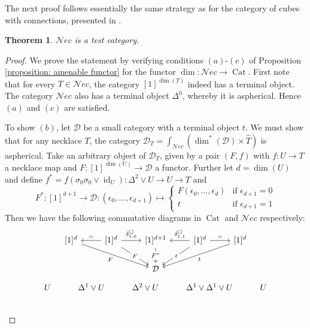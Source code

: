 \documentclass[12pt,a4paper,reqno]{amsart}
\DeclareMathOperator{\id}{id}
\DeclareMathOperator{\Cat}{Cat}
\newcommand{\nec}{\mathcal{N}ec} %
\newtheorem{Thm}{Theorem}[section]
\theoremstyle{definition}
\theoremstyle{remark}
\begin{document}
The next proof follows essentially the same strategy as for the category of cubes with connections, presented in \cite[Lemmas 3.10 and 3.11]{jardine2006categorical}.

\begin{Thm}\label{theorem: nec is test category}
$\nec$ is a test category.
\end{Thm}
\begin{proof}
We prove the statement by verifying conditions $(a)$-$(c)$ of Proposition \ref{proposition: amenable functor} for the functor $\dim: \nec\to \Cat$. First note that for every $T\in \nec$, the category $[1]^{\dim(T)}$ indeed has a terminal object. The category $\nec$ also has a terminal object $\Delta^{0}$, whereby it is aspherical. Hence $(a)$ and $(c)$ are satisfied.

To show $(b)$, let $\mathcal{D}$ be a small category with a terminal object $t$. We must show that for any necklace $T$, the category $\mathcal{D}_{T} = \int_{\nec}(\dim^{*}(\mathcal{D})\times \hat{T})$ is aspherical. Take an arbitrary object of $\mathcal{D}_{T}$, given by a pair $(F,f)$ with $f: U\to T$ a necklace map and $F: [1]^{\dim(U)}\rightarrow \mathcal{D}$ a functor. Further let $d = \dim(U)$ and define $f^{*} = f(\sigma_{0}\sigma_{0}\vee \id_{U}): \Delta^{2}\vee U\to U\to T$ and
$$
F^{*}: [1]^{d+1}\to \mathcal{D}: (\epsilon_{0},\dots,\epsilon_{d+1})\mapsto 
\begin{cases}
F(\epsilon_{0},\dots,\epsilon_{d}) & \text{if }\epsilon_{d+1} = 0\\
t & \text{if }\epsilon_{d+1} = 1
\end{cases}
$$
Then we have the following commutative diagrams in $\Cat$ and $\nec$ respectively:
\[\begin{tikzcd}
	{[1]^{d}} & {[1]^{d}} & {[1]^{d+1}} & {[1]^{d}} & {[1]^{d}} \\
	& & {\mathcal{D}}
	\arrow["{=}"', from=1-2, to=1-1]
	\arrow["{F}"', from=1-1, to=2-3]
	\arrow["{\delta^{\square}_{1,0}}", from=1-2, to=1-3]
	\arrow["{=}", from=1-4, to=1-5]
	\arrow["{\delta^{\square}_{1,1}}"', from=1-4, to=1-3]
	\arrow["F"{description}, from=1-2, to=2-3]
	\arrow["{F^{*}}"{description}, from=1-3, to=2-3]
	\arrow["t"{description}, from=1-4, to=2-3]
	\arrow["t", from=1-5, to=2-3]
\end{tikzcd}\]
\[\begin{tikzcd}
	U & \Delta^{1}\vee U & {\Delta^{2}\vee U} & {\Delta^{1}\vee \Delta^{1}\vee U} & U \\

\end{tikzcd}\]
\end{proof}
\end{document}

